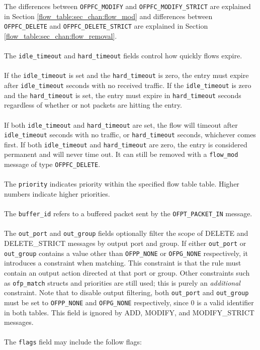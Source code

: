 
The differences between \verb|OFPFC_MODIFY| and \verb|OFPFC_MODIFY_STRICT| are explained in Section \ref{flow_table:sec_chan:flow_mod} and differences between \verb|OFPFC_DELETE| and \verb|OFPFC_DELETE_STRICT| are explained in Section \ref{flow_table:sec_chan:flow_removal}. 
\\\\
The \verb|idle_timeout| and \verb|hard_timeout| fields control how quickly flows expire.  
\\\\
If the \verb|idle_timeout| is set and the \verb|hard_timeout| is zero, the entry must expire after \verb|idle_timeout| seconds with no received traffic.  If the \verb|idle_timeout| is zero and the \verb|hard_timeout| is set, the entry must expire in \verb|hard_timeout| seconds regardless of whether or not packets are hitting the entry.
\\\\
If both \verb|idle_timeout| and \verb|hard_timeout| are set, the flow will timeout after \verb|idle_timeout| seconds with no traffic, or \verb|hard_timeout| seconds, whichever comes first.  If both \verb|idle_timeout| and \verb|hard_timeout| are zero, the entry is considered permanent and will never time out.  It can still be removed with a \verb|flow_mod| message of type \verb|OFPFC_DELETE|. 
\\\\
The \verb|priority| indicates priority within the specified flow table table. Higher numbers indicate higher priorities.
\\\\
The \verb|buffer_id| refers to a buffered packet sent by the \verb|OFPT_PACKET_IN| message.
\\\\
The \verb|out_port| and \verb|out_group| fields optionally filter the scope of DELETE and DELETE\_STRICT messages by output port and group.  If either \verb|out_port| or \verb|out_group| contains a value other than \verb|OFPP_NONE| or \verb|OFPG_NONE| respectively, it introduces a constraint when matching.  This constraint is that the rule must contain an output action directed at that port or group.  Other constraints such as \verb|ofp_match| structs and priorities are still used; this is purely an \emph{additional} constraint.  Note that to disable output filtering, both \verb|out_port| and \verb|out_group| must be set to \verb|OFPP_NONE| and \verb|OFPG_NONE| respectively, since 0 is a valid identifier in both tables.  This field is ignored by ADD, MODIFY, and MODIFY\_STRICT messages.
\\\\
The \verb|flags| field may include the follow flags:

